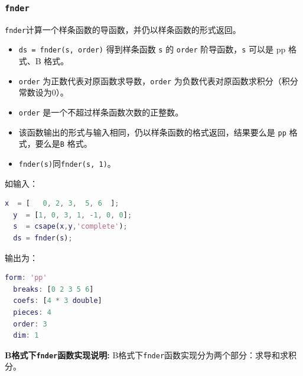 \subsubsection{\texttt{fnder}}

\texttt{fnder}计算一个样条函数的导函数，并仍以样条函数的形式返回。

\begin{itemize}
\item \texttt{ds = fnder(s, order)} 得到样条函数 \texttt{s} 的 \texttt{order} 阶导函数，\texttt{s} 可以是 pp 格式、B 格式。
\item \texttt{order} 为正数代表对原函数求导数，\texttt{order} 为负数代表对原函数求积分（积分常数设为0）。
\item \texttt{order} 是一个不超过样条函数次数的正整数。
\item 该函数输出的形式与输入相同，仍以样条函数的格式返回，结果要么是 \texttt{pp} 格式，要么是\texttt{B} 格式。
\item \texttt{fnder(s)}同\texttt{fnder(s, 1)}。
\end{itemize}

如输入：
\begin{lstlisting}[language = matlab]
  x  = [   0, 2, 3,  5, 6  ]; 
  y  = [1, 0, 3, 1, -1, 0, 0]; 
  s  = csape(x,y,'complete');
  ds = fnder(s); 
\end{lstlisting}

输出为：
\begin{lstlisting}[language = matlab ]
  form: 'pp'
  breaks: [0 2 3 5 6]
  coefs: [4 * 3 double]
  pieces: 4
  order: 3
  dim: 1
\end{lstlisting}
\textbf{B格式下\texttt{fnder}函数实现说明:}
B格式下\texttt{fnder}函数实现分为两个部分：求导和求积分。

